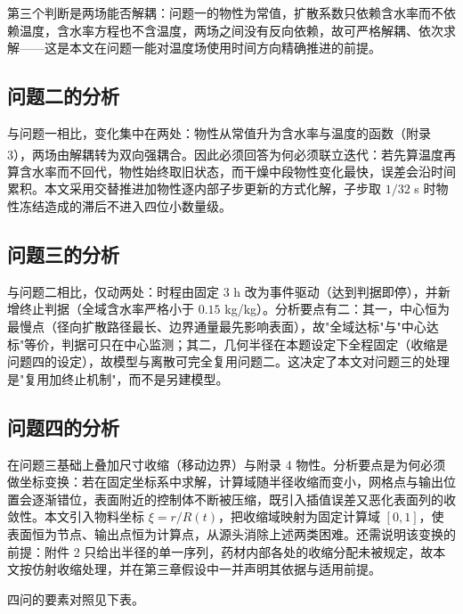 第三个判断是两场能否解耦：问题一的物性为常值，扩散系数只依赖含水率而不依赖温度，含水率方程也不含温度，两场之间没有反向依赖，故可严格解耦、依次求解——这是本文在问题一能对温度场使用时间方向精确推进的前提。

\subsection{问题二的分析}
与问题一相比，变化集中在两处：物性从常值升为含水率与温度的函数（附录 3），两场由解耦转为双向强耦合\textsuperscript{\cite{ref2,ref9}}。因此必须回答为何必须联立迭代：若先算温度再算含水率而不回代，物性始终取旧状态，而干燥中段物性变化最快，误差会沿时间累积。本文采用交替推进加物性逐内部子步更新的方式化解，子步取 $1/32$ s 时物性冻结造成的滞后不进入四位小数量级。

\subsection{问题三的分析}
与问题二相比，仅动两处：时程由固定 3 h 改为事件驱动（达到判据即停），并新增终止判据（全域含水率严格小于 $0.15$ kg/kg）。分析要点有二：其一，中心恒为最慢点（径向扩散路径最长、边界通量最先影响表面），故"全域达标"与"中心达标"等价，判据可只在中心监测；其二，几何半径在本题设定下全程固定（收缩是问题四的设定），故模型与离散可完全复用问题二。这决定了本文对问题三的处理是"复用加终止机制"，而不是另建模型。

\subsection{问题四的分析}
在问题三基础上叠加尺寸收缩（移动边界）与附录 4 物性。分析要点是为何必须做坐标变换：若在固定坐标系中求解，计算域随半径收缩而变小，网格点与输出位置会逐渐错位，表面附近的控制体不断被压缩，既引入插值误差又恶化表面列的收敛性。本文引入物料坐标 $\xi=r/R(t)$，把收缩域映射为固定计算域 $[0,1]$，使表面恒为节点、输出点恒为计算点，从源头消除上述两类困难。还需说明该变换的前提：附件 2 只给出半径的单一序列，药材内部各处的收缩分配未被规定，故本文按仿射收缩处理，并在第三章假设中一并声明其依据与适用前提。

四问的要素对照见下表。



